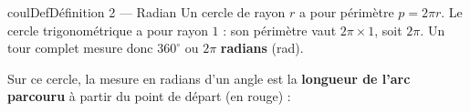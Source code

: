 \documentclass[11pt,a4paper]{article}
\makeatletter
\newcounter{lycee@signet}
\newcommand{\signet}[3][]{\stepcounter{lycee@signet}%
  \edef\lycee@dest{\if\relax\detokenize{#1}\relax
    signet.\arabic{lycee@signet}\else#1\fi}%
  \hypertarget{\lycee@dest}{}\bookmark[level=#2,dest=\lycee@dest]{#3}}
\newenvironment{definitionbox}[1][Définition]%
  {\begin{boitecours}[phantom={\signet{2}{#1}}]{coulDef}{#1}}{\end{boitecours}}
\makeatother
\begin{document}
\begin{definitionbox}[Définition 2 --- Radian]
Un cercle de rayon $r$ a pour périmètre $p=2\pi r$. Le cercle trigonométrique a pour
rayon $1$ : son périmètre vaut $2\pi\times 1$, soit $2\pi$. Un tour complet mesure donc
$360^{\circ}$ ou $2\pi$ \textbf{radians} (rad).

\smallskip
Sur ce cercle, la mesure en radians d'un angle est la \textbf{longueur de l'arc parcouru}
à partir du point de départ (en rouge) :

\medskip
\begin{minipage}[t]{0.24\linewidth}\centering
{}
\end{minipage}\hfill
\begin{minipage}[t]{0.24\linewidth}\centering
{}
\end{minipage}\hfill
\begin{minipage}[t]{0.24\linewidth}\centering
{}
\end{minipage}\hfill
\begin{minipage}[t]{0.24\linewidth}\centering
{}
\end{minipage}
\end{definitionbox}
\end{document}
